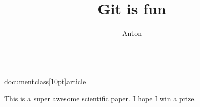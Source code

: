 \\documentclass[10pt]{article}
\author{Anton}
\title{Git is fun}
\begin{document}
  \maketitle

  This is a super awesome scientific paper. I hope I win a prize.
  
\end{document}
